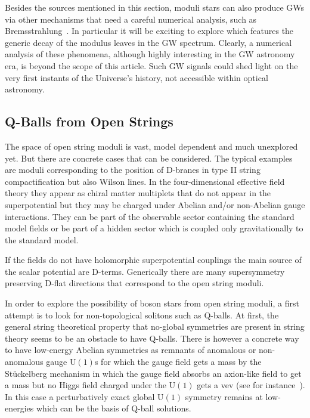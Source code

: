 \documentclass[11pt,a4paper]{article}
\begin{document}
Besides the sources mentioned in this section, moduli stars can also produce GWs via other mechanisms that need a careful numerical analysis, such as Bremsstrahlung~\cite{Dolgov:2011cq}. In particular it will be exciting to explore which features the generic decay of the modulus leaves in the GW spectrum. Clearly, a numerical analysis of these phenomena, although highly interesting in the GW astronomy era, is beyond the scope of this article. Such GW signals could shed light on the very first instants of the Universe's history, not accessible within optical astronomy.


 
\subsection{Q-Balls from Open Strings}
\label{sec:OpenStringsQBalls}

The space of open string moduli is vast, model dependent and much unexplored yet.  But there are concrete cases that can be considered. The typical examples are moduli corresponding to the position of D-branes in type II string compactification but also Wilson lines. In the four-dimensional effective field theory they appear as chiral matter multiplets that do not appear in the superpotential  but they may be charged under  Abelian and/or non-Abelian gauge interactions. They can be  part of the observable sector containing the standard model fields or be part of a hidden sector which is coupled only gravitationally to the standard model. 

If the fields do not have holomorphic superpotential couplings the main source of the scalar potential are D-terms. Generically there are many  supersymmetry preserving D-flat directions that correspond to the open string moduli.

In order to explore the possibility of boson stars from open string moduli, a first attempt is to look for non-topological solitons such as Q-balls. At first, the general string theoretical property that no-global symmetries are present in string theory seems to be an obstacle to have Q-balls. There is however a concrete way to have low-energy Abelian symmetries as remnants of anomalous or non-anomalous gauge U$(1)$s for which the gauge field gets a mass by the St\"uckelberg mechanism in which the gauge field absorbs an axion-like field to get a mass but no Higgs field charged under the U$(1)$ gets a vev (see for instance~\cite{Ibanez:2012zz}). In this case a perturbatively exact global U$(1)$ symmetry remains at low-energies which can be the basis of Q-ball solutions.
\end{document}
